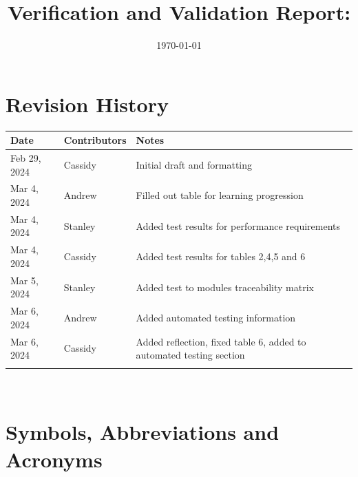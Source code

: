 \documentclass[12pt, titlepage]{article}
\begin{document}
\title{Verification and Validation Report: \progname} 
\author{\authname}
\date{\today}
	
\maketitle


\section{Revision History}

\begin{tabularx}{\textwidth}{p{3cm}p{3cm}X}
\toprule {\bf Date} & {\bf Contributors} & {\bf Notes}\\
\midrule
Feb 29, 2024 & Cassidy & Initial draft and formatting\\
Mar 4, 2024 & Andrew & Filled out table for learning progression\\
Mar 4, 2024 & Stanley & Added test results for performance requirements\\
Mar 4, 2024 & Cassidy & Added test results for tables 2,4,5 and 6\\
Mar 5, 2024 & Stanley & Added test to modules traceability matrix\\
Mar 6, 2024 & Andrew & Added automated testing information\\
Mar 6, 2024 & Cassidy & Added reflection, fixed table 6, added to automated testing section\\ 
 &  & \\
\bottomrule
\end{tabularx}

~\newpage

\section{Symbols, Abbreviations and Acronyms}
\end{document}
